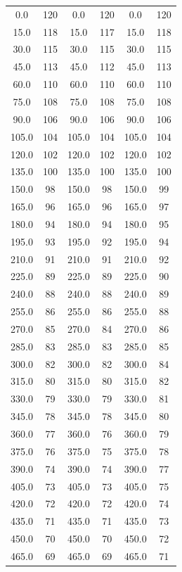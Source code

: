 \documentclass[12pt, a4paper]{article}
\begin{document}
\begin{center}
\begin{longtable}{| c | c | c | c | c | c |}
0.0   & 120 & 0.0   & 120 & 0.0   & 120 \\
15.0  & 118 & 15.0  & 117 & 15.0  & 118 \\
30.0  & 115 & 30.0  & 115 & 30.0  & 115 \\
45.0  & 113 & 45.0  & 112 & 45.0  & 113 \\
60.0  & 110 & 60.0  & 110 & 60.0  & 110 \\
75.0  & 108 & 75.0  & 108 & 75.0  & 108 \\
90.0  & 106 & 90.0  & 106 & 90.0  & 106 \\
105.0 & 104 & 105.0 & 104 & 105.0 & 104 \\
120.0 & 102 & 120.0 & 102 & 120.0 & 102 \\
135.0 & 100 & 135.0 & 100 & 135.0 & 100 \\
150.0 & 98  & 150.0 & 98  & 150.0 & 99  \\
165.0 & 96  & 165.0 & 96  & 165.0 & 97  \\
180.0 & 94  & 180.0 & 94  & 180.0 & 95  \\
195.0 & 93  & 195.0 & 92  & 195.0 & 94  \\
210.0 & 91  & 210.0 & 91  & 210.0 & 92  \\
225.0 & 89  & 225.0 & 89  & 225.0 & 90  \\
240.0 & 88  & 240.0 & 88  & 240.0 & 89  \\
255.0 & 86  & 255.0 & 86  & 255.0 & 88  \\
270.0 & 85  & 270.0 & 84  & 270.0 & 86  \\
285.0 & 83  & 285.0 & 83  & 285.0 & 85  \\
300.0 & 82  & 300.0 & 82  & 300.0 & 84  \\
315.0 & 80  & 315.0 & 80  & 315.0 & 82  \\
330.0 & 79  & 330.0 & 79  & 330.0 & 81  \\
345.0 & 78  & 345.0 & 78  & 345.0 & 80  \\
360.0 & 77  & 360.0 & 76  & 360.0 & 79  \\
375.0 & 76  & 375.0 & 75  & 375.0 & 78  \\
390.0 & 74  & 390.0 & 74  & 390.0 & 77  \\
405.0 & 73  & 405.0 & 73  & 405.0 & 75  \\
420.0 & 72  & 420.0 & 72  & 420.0 & 74  \\
435.0 & 71  & 435.0 & 71  & 435.0 & 73  \\
450.0 & 70  & 450.0 & 70  & 450.0 & 72  \\
465.0 & 69  & 465.0 & 69  & 465.0 & 71  \\

\end{longtable}
\end{center}
\end{document}

